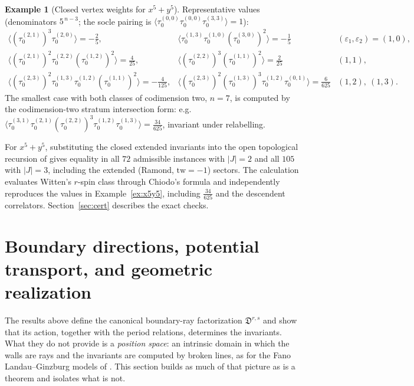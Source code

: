 \documentclass[11pt]{amsart}
\theoremstyle{definition}
\newtheorem{example}[theorem]{Example}
\theoremstyle{remark}
\newcommand{\Dscr}{\mathfrak{D}}
\begin{document}
\begin{example}[Closed vertex weights for $x^{5}+y^{5}$]
Representative values (denominators $5^{\,n-3}$; the socle pairing is
$\langle\tau_{0}^{(0,0)}\tau_{0}^{(0,0)}\tau_{0}^{(3,3)}\rangle=1$):
\[
\renewcommand{\arraystretch}{1.4}
\begin{array}{lll}
\langle(\tau_{0}^{(2,1)})^{3}\tau_{0}^{(2,0)}\rangle=-\tfrac25, &
\langle\tau_{0}^{(1,3)}\tau_{0}^{(1,0)}(\tau_{0}^{(3,0)})^{2}\rangle=-\tfrac15
& (\varepsilon_{1},\varepsilon_{2})=(1,0),\\
\langle(\tau_{0}^{(2,1)})^{2}\tau_{0}^{(2,2)}(\tau_{0}^{(1,2)})^{2}\rangle
=\tfrac{4}{25}, &
\langle(\tau_{0}^{(2,2)})^{3}(\tau_{0}^{(1,1)})^{2}\rangle=\tfrac{2}{25}
& (1,1),\\
\langle(\tau_{0}^{(2,3)})^{2}\tau_{0}^{(1,3)}\tau_{0}^{(1,2)}
(\tau_{0}^{(1,1)})^{2}\rangle=-\tfrac{4}{125}, &
\langle(\tau_{0}^{(2,3)})^{2}(\tau_{0}^{(1,3)})^{3}\tau_{0}^{(1,2)}
\tau_{0}^{(0,1)}\rangle=\tfrac{6}{625}
& (1,2),\ (1,3).
\end{array}
\]
The smallest case with both classes of codimension two, $n=7$, is computed by
the codimension-two stratum intersection form: e.g.\
$\langle\tau_{0}^{(3,1)}\tau_{0}^{(2,1)}(\tau_{0}^{(2,2)})^{3}\tau_{0}^{(1,2)}
\tau_{0}^{(1,3)}\rangle=\tfrac{34}{625}$, invariant under relabelling.
\end{example}

For $x^{5}+y^{5}$, substituting the closed extended invariants into the open
topological recursion of \cite[Thm.~0.5]{GKT} gives equality in all $72$
admissible instances with $|J|=2$ and all $105$ with $|J|=3$, including the
extended (Ramond, $\mathrm{tw}=-1$) sectors.  The calculation evaluates
Witten's $r$-spin class through Chiodo's formula and independently reproduces
the values in Example~\ref{ex:x5y5}, including $\tfrac{34}{625}$ and the
descendent correlators.  Section~\ref{sec:cert} describes the exact checks.

\section{Boundary directions, potential transport, and geometric realization}
\label{sec:geometric}

The results above define the canonical boundary-ray factorization
$\Dscr^{r,s}$ and show that its action, together with the period relations,
determines the invariants. What they do not provide is a
\emph{position space}: an intrinsic domain in which the walls are rays and the
invariants are computed by broken lines, as for the Fano Landau--Ginzburg models
of \cite{Gross10,CPS}. This section builds as much of that picture as is a theorem
and isolates what is not.
\end{document}
